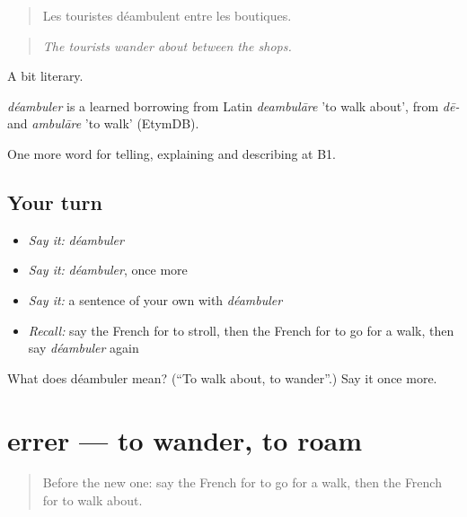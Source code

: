 \begin{quote}
Les touristes déambulent entre les boutiques.
\end{quote}

\begin{quote}
\emph{The tourists wander about between the shops.}
\end{quote}

A bit literary.

\begin{cousinweb}
\emph{déambuler} is a learned borrowing from Latin \emph{deambulāre} 'to walk about', from \emph{dē-} and \emph{ambulāre} 'to walk' (EtymDB).
\end{cousinweb}

\begin{grammarlens}[title={What you've built}]
One more word for telling, explaining and describing at B1.
\end{grammarlens}

\subsection*{Your turn}
\begin{itemize}
\raggedright
  \item \emph{Say it:} \emph{déambuler}
  \item \emph{Say it:} \emph{déambuler}, once more
  \item \emph{Say it:} a sentence of your own with \emph{déambuler}
  \item \emph{Recall:} say the French for to stroll, then the French for to go for a walk, then say \emph{déambuler} again
\end{itemize}

\begin{tcolorbox}[breakable,colback=teal!4,colframe=teal!35!black,title={Before you move on}]
What does déambuler mean? (\textquotedblleft{}To walk about, to wander\textquotedblright{}.) Say it once more.
\end{tcolorbox}
\section[errer]{errer — to wander, to roam}

\label{lesson:FR-C438-errer}



\begin{quote}
Before the new one: say the French for to go for a walk, then the French for to walk about.
\end{quote}

